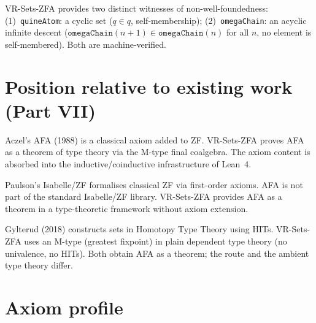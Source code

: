 \begin{remark}
\label{rem:M7_two_modes}
\leanok
{}
VR-Sets-ZFA provides two distinct witnesses of non-well-foundedness:
(1)~\texttt{quineAtom}: a cyclic set ($q \in q$, self-membership);
(2)~\texttt{omegaChain}: an acyclic infinite descent
($\texttt{omegaChain}(n+1) \in \texttt{omegaChain}(n)$ for all $n$,
no element is self-membered).  Both are machine-verified.
\end{remark}

\section{Position relative to existing work (Part VII)}
\label{sec:setszfa_comparison}

\begin{remark}
\label{rem:compare_aczel}
\leanok
Aczel's AFA (1988) is a classical axiom added to ZF.  VR-Sets-ZFA proves
AFA as a theorem of type theory via the M-type final coalgebra.  The axiom
content is absorbed into the inductive/coinductive infrastructure of Lean~4.
\end{remark}

\begin{remark}
\label{rem:compare_paulson}
\leanok
Paulson's Isabelle/ZF formalises classical ZF via first-order axioms.
AFA is not part of the standard Isabelle/ZF library.  VR-Sets-ZFA provides
AFA as a theorem in a type-theoretic framework without axiom extension.
\end{remark}

\begin{remark}
\label{rem:compare_gylterud}
\leanok
Gylterud (2018) constructs sets in Homotopy Type Theory using HITs.
VR-Sets-ZFA uses an M-type (greatest fixpoint) in plain dependent type
theory (no univalence, no HITs).  Both obtain AFA as a theorem; the
route and the ambient type theory differ.
\end{remark}

\section{Axiom profile}
\label{sec:setszfa_axiom_profile}

